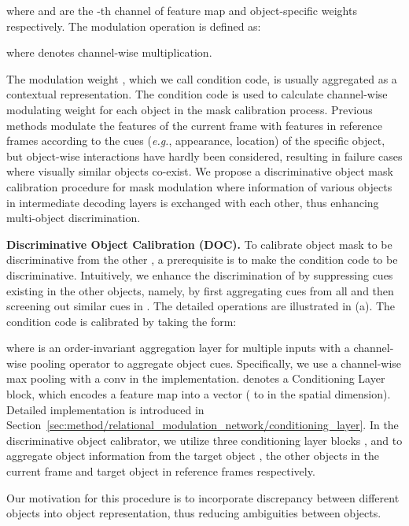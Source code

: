 \documentclass[sigconf]{acmart}
\begin{document}
where  and  are the -th channel of feature map  and object-specific weights  respectively. The modulation operation is defined as:

where  denotes channel-wise multiplication.

The modulation weight , which we call condition code, is usually aggregated as a contextual representation. The condition code is used to calculate channel-wise modulating weight for each object in the mask calibration process. 
Previous methods modulate the features  of the current frame with
features  in reference frames according to the cues (\textit{e.g.}, appearance, location) of the specific object, but object-wise interactions have hardly been considered, resulting in failure cases where visually similar objects co-exist.
We propose a discriminative object mask calibration procedure for mask modulation where information of various objects in intermediate decoding layers is exchanged with each other, thus enhancing multi-object discrimination. 


\noindent\textbf{Discriminative Object Calibration (DOC).}
\label{sec:method/relational_modulation_network/inter_object_interaction}
To calibrate object mask  to be discriminative from the other , a prerequisite is to make the condition code  to be discriminative.
Intuitively, we enhance the discrimination of  by suppressing cues existing in the other objects, namely, by first aggregating cues from all  and then screening out similar cues in .
The detailed operations are illustrated in \fig{\ref{fig:multi-object-discrimination}} (a). The condition code  is calibrated by taking the form:

where  is an order-invariant aggregation layer for multiple inputs with a channel-wise pooling operator to aggregate object cues. Specifically, we use a channel-wise max pooling with a  conv in the implementation.  denotes a Conditioning Layer block, which encodes a feature map into a vector ( to  in the spatial dimension). Detailed implementation is introduced in Section~\ref{sec:method/relational_modulation_network/conditioning_layer}. In the discriminative object calibrator, we utilize three conditioning layer blocks ,  and  to aggregate object information from the target object , the other objects in the current frame  and target object in reference frames  respectively.


Our motivation for this procedure is to incorporate discrepancy between different objects into object representation, thus reducing ambiguities between objects. 
\end{document}
